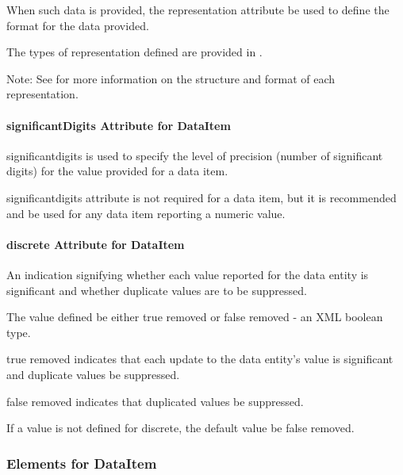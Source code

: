 When such data is provided, the \gls{representation} attribute \must be used to define the format for the data provided.

The types of \gls{representation} defined are provided in .

\begin{note}
Note:  See  for more information on the structure and format of each \gls{representation}.

\end{note}



\pagebreak

\paragraph{significantDigits Attribute for DataItem}\mbox{}

\gls{significantdigits} is used to specify the level of precision (number of significant digits) for the value provided for a data item.

\gls{significantdigits} attribute is not required for a data item, but it is recommended and \should be used for any data item reporting a numeric value.

\paragraph{discrete Attribute for DataItem}\label{sec:discrete-attribute}\mbox{}

An indication signifying whether each value reported for the \gls{data entity} is significant and whether duplicate values are to be suppressed.

The value defined \MUST be either \gls{true removed} or \gls{false removed} - an XML boolean type.

\gls{true removed} indicates that each update to the \gls{data entity}'s value is significant and duplicate values \MUSTNOT be suppressed.

\gls{false removed} indicates that duplicated values \MUST be suppressed.

If a value is not defined for \gls{discrete}, the default value \MUST be \gls{false removed}.

\subsubsection{Elements for DataItem}

